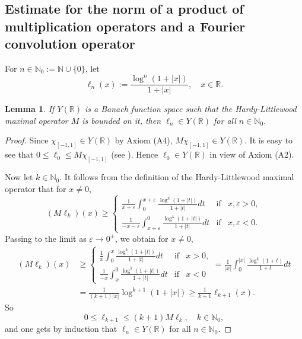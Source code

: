 \documentclass[reqno]{amsproc}
\newcommand{\eps}{\varepsilon}
\newcommand{\N}{\mathbb{N}}
\newcommand{\R}{\mathbb{R}}
\newtheorem{lemma}[theorem]{Lemma}
\theoremstyle{definition}
\theoremstyle{remark}
\numberwithin{equation}{section}
\begin{document}
\subsection{Estimate for the norm of a product of multiplication operators and
a Fourier convolution operator}
For $n\in\N_0:=\N\cup\{0\}$, let
\[
\ell_n(x) := \frac{\log^n (1 + |x|)}{1 + |x|}, \quad x \in \mathbb{R}.
\]
\begin{lemma}\label{le:ell-n}
If $Y(\R)$ is a Banach function space such that the Hardy-Littlewood
maximal operator $M$ is bounded on it, then $\ell_n \in Y(\mathbb{R})$
for all $n\in\N_0$.
\end{lemma}
\begin{proof}
Since $\chi_{[-1, 1]} \in Y(\mathbb{R})$ by Axiom (A4), 
$M\chi_{[-1, 1]} \in Y(\mathbb{R})$. It is easy to see
that $0 \le \ell_0 \le M\chi_{[-1, 1]}$ (see \cite[Example 2.1.4]{G14}). 
Hence $\ell_0 \in Y(\mathbb{R})$ in view of Axiom (A2).

Now let $k\in\N_0$. It follows from the definition of the 
Hardy-Littlewood maximal operator that for $x\ne 0$,
\[
(M\ell_k)(x)
\ge 
\left\{\begin{array}{lll}
\displaystyle
\frac{1}{x+\eps}\int_0^{x+\eps}\frac{\log^k(1+|t|)}{1+|t|}dt
&\mbox{if}& x,\eps>0,
\\[4mm]
\displaystyle
\frac{1}{-x-\eps}\int_{x+\eps}^0\frac{\log^k(1+|t|)}{1+|t|}dt
&\mbox{if}& x,\eps<0.
\end{array}\right.
\]
Passing to the limit as $\eps\to 0^\pm$, we obtain for $x\ne 0$,
\begin{align*}
(M\ell_k)(x)
&\ge 
\left\{\begin{array}{lll}
\displaystyle
\frac{1}{x}\int_0^{x}\frac{\log^k(1+|t|)}{1+|t|}dt
&\mbox{if}& x>0,
\\[4mm]
\displaystyle
\frac{1}{-x}\int_{x}^0\frac{\log^k(1+|t|)}{1+|t|}dt
&\mbox{if}& x<0
\end{array}\right.
=
\frac{1}{|x|}\int_0^{|x|}\frac{\log^k(1+t)}{1+t}dt
\\
&=
\frac{1}{(k+1)|x|}\log^{k+1}(1+|x|)
\ge
\frac{1}{k+1}\ell_{k+1}(x).
\end{align*}
So
\[
0\le\ell_{k+1}\le(k+1)M\ell_k,\quad k\in\N_0,
\]
and one gets by induction that $\ell_n\in Y(\R)$ for all $n\in\N_0$.
\end{proof}
\end{document}

